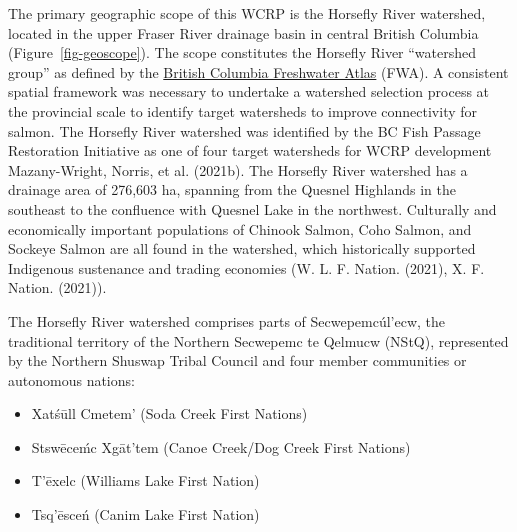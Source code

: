\documentclass[
  letterpaper,
  DIV=11,
  numbers=noendperiod]{scrreprt}
\begin{document}
The primary geographic scope of this WCRP is the Horsefly River
watershed, located in the upper Fraser River drainage basin in central
British Columbia (Figure~\ref{fig-geoscope}). The scope constitutes the
Horsefly River ``watershed group'' as defined by the
\href{https://catalogue.data.gov.bc.ca/dataset/freshwater-atlas-watershed-groups}{British
Columbia Freshwater Atlas} (FWA). A consistent spatial framework was
necessary to undertake a watershed selection process at the provincial
scale to identify target watersheds to improve connectivity for salmon.
The Horsefly River watershed was identified by the BC Fish Passage
Restoration Initiative as one of four target watersheds for WCRP
development Mazany-Wright, Norris, et al. (2021b). The Horsefly River
watershed has a drainage area of 276,603 ha, spanning from the Quesnel
Highlands in the southeast to the confluence with Quesnel Lake in the
northwest. Culturally and economically important populations of Chinook
Salmon, Coho Salmon, and Sockeye Salmon are all found in the watershed,
which historically supported Indigenous sustenance and trading economies
(W. L. F. Nation. (2021), X. F. Nation. (2021)).

The Horsefly River watershed comprises parts of Secwepemcúl'ecw, the
traditional territory of the Northern Secwepemc te Qelmucw (NStQ),
represented by the Northern Shuswap Tribal Council and four member
communities or autonomous nations:

\begin{itemize}
\item
  Xatśūll Cmetem' (Soda Creek First Nations)
\item
  Stswēceḿc Xgāt'tem (Canoe Creek/Dog Creek First Nations)
\item
  T'ēxelc (Williams Lake First Nation)
\item
  Tsq'ēsceń (Canim Lake First Nation)
\end{itemize}
\end{document}
